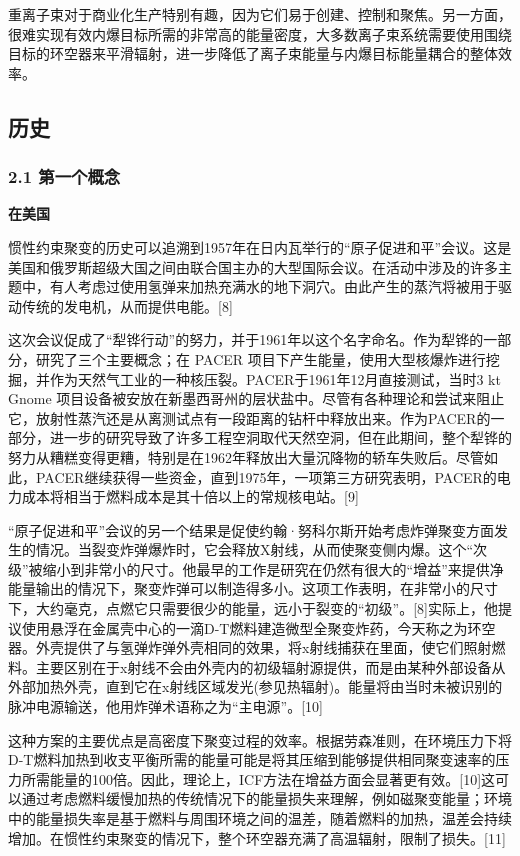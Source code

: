 重离子束对于商业化生产特别有趣，因为它们易于创建、控制和聚焦。另一方面，很难实现有效内爆目标所需的非常高的能量密度，大多数离子束系统需要使用围绕目标的环空器来平滑辐射，进一步降低了离子束能量与内爆目标能量耦合的整体效率。

\subsection{ 历史}
\subsubsection{2.1 第一个概念}

\textbf{在美国}

惯性约束聚变的历史可以追溯到1957年在日内瓦举行的“原子促进和平”会议。这是美国和俄罗斯超级大国之间由联合国主办的大型国际会议。在活动中涉及的许多主题中，有人考虑过使用氢弹来加热充满水的地下洞穴。由此产生的蒸汽将被用于驱动传统的发电机，从而提供电能。[8]

这次会议促成了“犁铧行动”的努力，并于1961年以这个名字命名。作为犁铧的一部分，研究了三个主要概念；在 PACER 项目下产生能量，使用大型核爆炸进行挖掘，并作为天然气工业的一种核压裂。PACER于1961年12月直接测试，当时3 kt Gnome 项目设备被安放在新墨西哥州的层状盐中。尽管有各种理论和尝试来阻止它，放射性蒸汽还是从离测试点有一段距离的钻杆中释放出来。作为PACER的一部分，进一步的研究导致了许多工程空洞取代天然空洞，但在此期间，整个犁铧的努力从糟糕变得更糟，特别是在1962年释放出大量沉降物的轿车失败后。尽管如此，PACER继续获得一些资金，直到1975年，一项第三方研究表明，PACER的电力成本将相当于燃料成本是其十倍以上的常规核电站。[9]

“原子促进和平”会议的另一个结果是促使约翰·努科尔斯开始考虑炸弹聚变方面发生的情况。当裂变炸弹爆炸时，它会释放X射线，从而使聚变侧内爆。这个“次级”被缩小到非常小的尺寸。他最早的工作是研究在仍然有很大的“增益”来提供净能量输出的情况下，聚变炸弹可以制造得多小。这项工作表明，在非常小的尺寸下，大约毫克，点燃它只需要很少的能量，远小于裂变的“初级”。[8]实际上，他提议使用悬浮在金属壳中心的一滴D-T燃料建造微型全聚变炸药，今天称之为环空器。外壳提供了与氢弹炸弹外壳相同的效果，将x射线捕获在里面，使它们照射燃料。主要区别在于x射线不会由外壳内的初级辐射源提供，而是由某种外部设备从外部加热外壳，直到它在x射线区域发光(参见热辐射)。能量将由当时未被识别的脉冲电源输送，他用炸弹术语称之为“主电源”。[10]

这种方案的主要优点是高密度下聚变过程的效率。根据劳森准则，在环境压力下将D-T燃料加热到收支平衡所需的能量可能是将其压缩到能够提供相同聚变速率的压力所需能量的100倍。因此，理论上，ICF方法在增益方面会显著更有效。[10]这可以通过考虑燃料缓慢加热的传统情况下的能量损失来理解，例如磁聚变能量；环境中的能量损失率是基于燃料与周围环境之间的温差，随着燃料的加热，温差会持续增加。在惯性约束聚变的情况下，整个环空器充满了高温辐射，限制了损失。[11]

